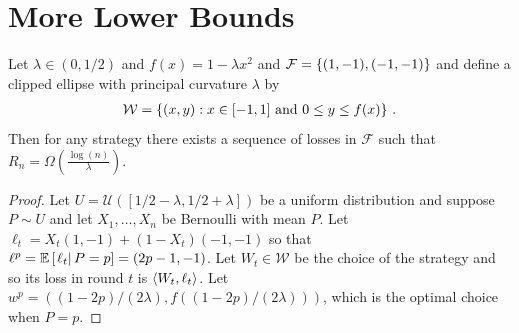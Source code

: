 \section{More Lower Bounds}
\begin{thm}
	Let $\lambda \in (0,1/2)$ and $f(x) = 1 - \lambda x^2$ and $\mathcal F = \left\{(1,-1),(-1,-1)\right\}$ and define a clipped ellipse with principal curvature $\lambda$ by 
	\begin{align*}
	\mathcal W = \left\{(x, y) : x \in [-1,1] \text{ and } 0 \leq y \leq f(x)\right\}\,.
	\end{align*}
	Then for any strategy there exists a sequence of losses in $\mathcal F$ such that $R_n = \Omega\left(\frac{\log(n)}{\lambda}\right)$.
\end{thm}

\begin{proof}
	Let $U = \mathcal U([1/2-\lambda,1/2+\lambda])$ be a uniform distribution
	and suppose $P \sim U$ and let $X_1,\ldots,X_n$ be Bernoulli
	with mean $P$. Let $\ell_t = X_t (1,-1) + (1 - X_t)(-1,-1)$ so that $\ell^p = \mathbb{E}\left[ \left. \ell_t \right| P=p \right] = (2p - 1, -1)$.
	Let $W_t \in \mathcal W$ be the choice of the strategy and so its loss in round $t$ is $\left\langle W_t, \ell_t\right\rangle$.
	Let $w^p = ((1 - 2p)/(2\lambda), f((1-2p)/(2\lambda)))$, which is the optimal choice when $P=p$. 
	

\end{proof}
